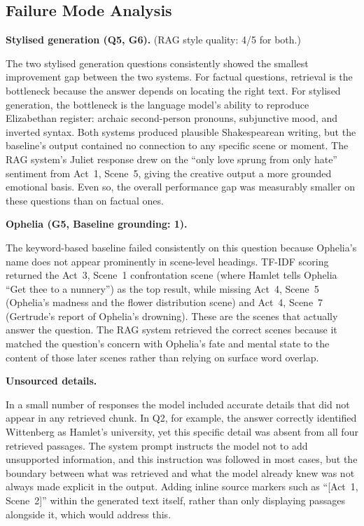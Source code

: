 \documentclass[10pt,conference]{IEEEtran}
\begin{document}
\subsection{Failure Mode Analysis}

\medskip\noindent\textbf{Stylised generation (Q5, G6).}
(RAG style quality: 4/5 for both.)

The two stylised generation questions consistently showed the smallest
improvement gap between the two systems. For factual questions,
retrieval is the bottleneck because the answer depends on locating
the right text. For stylised generation, the bottleneck is the
language model's ability to reproduce Elizabethan register: archaic
second-person pronouns, subjunctive mood, and inverted syntax. Both
systems produced plausible Shakespearean writing, but the baseline's
output contained no connection to any specific scene or moment. The
RAG system's Juliet response drew on the ``only love sprung from
only hate'' sentiment from Act~1, Scene~5, giving the creative output
a more grounded emotional basis. Even so, the overall performance gap
was measurably smaller on these questions than on factual ones.

\medskip\noindent\textbf{Ophelia (G5, Baseline grounding: 1).}

The keyword-based baseline failed consistently on this question because
Ophelia's name does not appear prominently in scene-level headings.
TF-IDF scoring returned the Act~3, Scene~1 confrontation scene (where
Hamlet tells Ophelia ``Get thee to a nunnery'') as the top result,
while missing Act~4, Scene~5 (Ophelia's madness and the flower
distribution scene) and Act~4, Scene~7 (Gertrude's report of
Ophelia's drowning). These are the scenes that actually answer the
question. The RAG system retrieved the correct scenes because it
matched the question's concern with Ophelia's fate and mental state
to the content of those later scenes rather than relying on surface
word overlap.

\medskip\noindent\textbf{Unsourced details.}

In a small number of responses the model included accurate details
that did not appear in any retrieved chunk. In Q2, for example, the
answer correctly identified Wittenberg as Hamlet's university, yet
this specific detail was absent from all four retrieved passages. The
system prompt instructs the model not to add unsupported information,
and this instruction was followed in most cases, but the boundary
between what was retrieved and what the model already knew was not
always made explicit in the output. Adding inline source markers such
as ``[Act~1, Scene~2]'' within the generated text itself, rather
than only displaying passages alongside it, which would address this.
\end{document}
